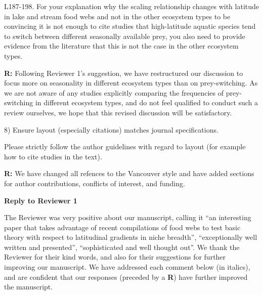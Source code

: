 \documentclass[12pt]{letter}
\newenvironment{refquote}{\bigskip \begin{it}}{\end{it}\smallskip}
\begin{document}
  \begin{refquote}

    L187-198. For your explanation why the scaling relationship changes with
    latitude in lake and stream food webs and not in the other ecosystem types
    to be convincing it is not enough to cite studies that high-latitude
    aquatic species tend to switch between different seasonally available
    prey, you also need to provide evidence from the literature that this is
    not the case in the other ecosystem types.

  \end{refquote}


  \textbf{R:} Following Reviewer 1's suggestion, we have restructured our discussion
    to focus more on seasonality in different ecosystem types than on prey-switching.
    As we are not aware of any studies explicitly comparing the frequencies of 
    prey-switching in different ecosystem types, and do not feel qualified to conduct
    such a review ourselves, we hope that this revised discussion will be satisfactory.


  8) Ensure layout (especially citations) matches journal specifications.

  \begin{refquote}

    Please strictly follow the author guidelines with regard to layout (for
    example how to cite studies in the text).

  \end{refquote}

  \textbf{R:} We have changed all refences to the Vancouver style and have 
    added sections for author contributions, conflicts of interest, and funding.

  \newpage

{\Large \bf Reply to Reviewer 1}

  The Reviewer was very positive about our manuscript, calling it
  ``an interesting paper that takes advantage of recent compilations
  of food webs to test basic theory with respect to latitudinal gradients in
  niche breadth'', ``exceptionally well written and presented'', ``sophisticated
  and well thought out''. We thank the Reviewer for their kind words,
  and also for their suggestions for further improving our manuscript. We
  have addressed each comment below (in italics), and are confident that our
  responses (preceded by a \textbf{R}) have further improved the manuscript.
  
\end{document}
